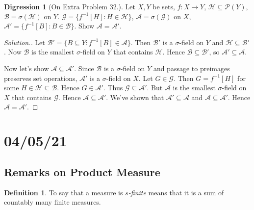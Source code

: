 \documentclass{article}
\theoremstyle{definition}
\newtheorem*{definition}{Definition}
\newtheorem*{digression}{Digression}
\begin{document}
\begin{digression}[On Extra Problem 32.]
Let $X, Y$ be sets, $f : X \to Y$, $\mathscr{H} \subseteq \mathcal{P}(Y)$, $\mathscr{B} = \sigma(\mathscr{H})$ on $Y$. $\mathscr{G} = \{f^{-1}[H] : H \in \mathscr{H}\}$, $\mathscr{A} = \sigma(\mathscr{G})$ on $X$, $\mathscr{A}' = \{f^{-1}[B] : B \in \mathscr{B}\}$. Show $\mathscr{A} = \mathscr{A}'$.

\begin{proof}[Solution.]
    Let $\mathscr{B}' = \{B \subseteq Y : f^{-1}[B] \in \mathscr{A}\}$. Then $\mathscr{B}'$ is a $\sigma$-field on $Y$ and $\mathscr{H} \subseteq \mathscr{B}'$. Now $\mathscr{B}$ is the smallest $\sigma$-field on $Y$ that contains $\mathscr{H}$. Hence $\mathscr{B} \subseteq \mathscr{B}'$, so $\mathscr{A}' \subseteq \mathscr{A}$.
    
    Now let's show $\mathscr{A} \subseteq \mathscr{A}'$. Since $\mathscr{B}$ is a $\sigma$-field on $Y$ and passage to preimages preserves set operations, $\mathscr{A}'$ is a $\sigma$-field on $X$. Let $G \in \mathscr{G}$. Then $G = f^{-1}[H]$ for some $H \in \mathscr{H} \subseteq \mathscr{B}$. Hence $G \in \mathscr{A}'$. Thus $\mathscr{G} \subseteq \mathscr{A}'$. But $\mathscr{A}$ is the smallest $\sigma$-field on $X$ that contains $\mathscr{G}$. Hence $\mathscr{A} \subseteq \mathscr{A}'$. We've shown that $\mathscr{A}' \subseteq \mathscr{A}$ and $\mathscr{A} \subseteq \mathscr{A}'$. Hence $\mathscr{A} = \mathscr{A}'$.
\end{proof}
\end{digression}

\section*{04/05/21}

\subsection*{Remarks on Product Measure}

\begin{definition}
To say that a measure is \emph{$s$-finite} means that it is a sum of countably many finite measures.
\end{definition}
\end{document}
